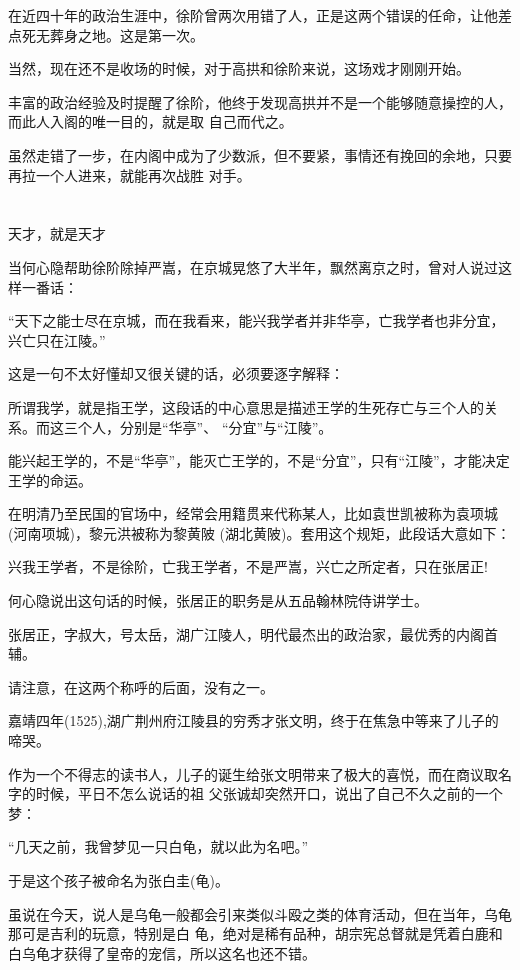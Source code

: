 \documentclass[11pt,a4paper,onecolumn]{article}
\begin{document}
在近四十年的政治生涯中，徐阶曾两次用错了人，正是这两个错误的任命，让他差点死无葬身之地。这是第一次。

当然，现在还不是收场的时候，对于高拱和徐阶来说，这场戏才刚刚开始。

丰富的政治经验及时提醒了徐阶，他终于发现高拱并不是一个能够随意操控的人，而此人入阁的唯一目的，就是取
自己而代之。

虽然走错了一步，在内阁中成为了少数派，但不要紧，事情还有挽回的余地，只要再拉一个人进来，就能再次战胜
对手。

\section[\thesection]{}

天才，就是天才

当何心隐帮助徐阶除掉严嵩，在京城晃悠了大半年，飘然离京之时，曾对人说过这样一番话：

``天下之能士尽在京城，而在我看来，能兴我学者并非华亭，亡我学者也非分宜，兴亡只在江陵。''

这是一句不太好懂却又很关键的话，必须要逐字解释：

所谓我学，就是指王学，这段话的中心意思是描述王学的生死存亡与三个人的关系。而这三个人，分别是``华亭''、
``分宜''与``江陵''。

能兴起王学的，不是``华亭''，能灭亡王学的，不是``分宜''，只有``江陵''，才能决定王学的命运。

在明清乃至民国的官场中，经常会用籍贯来代称某人，比如袁世凯被称为袁项城(河南项城)，黎元洪被称为黎黄陂
(湖北黄陂)。套用这个规矩，此段话大意如下：

兴我王学者，不是徐阶，亡我王学者，不是严嵩，兴亡之所定者，只在张居正!

何心隐说出这句话的时候，张居正的职务是从五品翰林院侍讲学士。

张居正，字叔大，号太岳，湖广江陵人，明代最杰出的政治家，最优秀的内阁首辅。

请注意，在这两个称呼的后面，没有之一。

嘉靖四年(1525),湖广荆州府江陵县的穷秀才张文明，终于在焦急中等来了儿子的啼哭。

作为一个不得志的读书人，儿子的诞生给张文明带来了极大的喜悦，而在商议取名字的时候，平日不怎么说话的祖
父张诚却突然开口，说出了自己不久之前的一个梦：

``几天之前，我曾梦见一只白龟，就以此为名吧。''

于是这个孩子被命名为张白圭(龟)。

虽说在今天，说人是乌龟一般都会引来类似斗殴之类的体育活动，但在当年，乌龟那可是吉利的玩意，特别是白
龟，绝对是稀有品种，胡宗宪总督就是凭着白鹿和白乌龟才获得了皇帝的宠信，所以这名也还不错。
\end{document}
